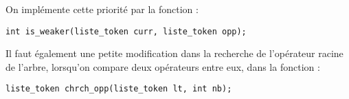 \documentclass[11pt]{article}
\begin{document}
\noindent On implémente cette priorité par la fonction :
\begin{verbatim}
int is_weaker(liste_token curr, liste_token opp);
\end{verbatim}
Il faut également une petite modification dans la recherche de l'opérateur racine de l'arbre, lorsqu'on compare deux opérateurs entre eux, dans la fonction :
\begin{verbatim}
liste_token chrch_opp(liste_token lt, int nb);
\end{verbatim}
\end{document}
